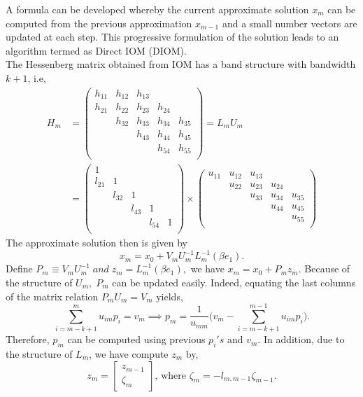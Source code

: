 \documentclass[10pt,a4paper]{article}
\begin{document}
A formula can be developed whereby the current approximate solution $x_m$ can be computed from the previous approximation $x_{m-1}$ and a small number vectors are updated at each step. This progressive formulation of the solution leads to an algorithm termed as Direct IOM (DIOM).\\
The Hessenberg matrix obtained from IOM has a band structure with bandwidth $k+1$, i.e,
\begin{align*}
H_m &= \left( \begin{array}{ccccc}
h_{11} & h_{12} & h_{13} &  &  \\
h_{21} & h_{22} & h_{23} & h_{24} &  \\
 & h_{32} & h_{33} & h_{34} & h_{35} \\
 &  & h_{43} & h_{44} & h_{45} \\
 &  &  & h_{54} & h_{55} \\
\end{array} \right) = L_mU_m \\
&= \left( \begin{array}{ccccc}
1 &  &  &  &  \\
l_{21} & 1 &  &  &  \\
 & l_{32} & 1 &  &  \\
 &  & l_{43} & 1 &  \\
 &  &  & l_{54} & 1 \\
\end{array} \right)\times 
\left( \begin{array}{ccccc}
u_{11} & u_{12} & u_{13} &  &  \\
 & u_{22} & u_{23} & u_{24} &  \\
 &  & u_{33} & u_{34} & u_{35} \\
 &  &  & u_{44} & u_{45} \\
 &  &  &  & u_{55} \\
\end{array} \right) 
\end{align*}
The approximate solution then is given by 
$$x_m=x_0+V_mU^{-1}_mL^{-1}_m(\beta e_1).$$
Define $P_m\equiv V_mU^{-1}_m\;and\;z_m=L^{-1}_m(\beta e_1),$ we have $x_m=x_0+P_mz_m.$ Because of the structure of $U_m,\;P_m$ can be updated easily. Indeed, equating the last columns of the matrix relation $P_mU_m=V_m$ yields,
$$\sum^m_{i=m-k+1} u_{im}p_i=v_m\implies p_m = \frac{1}{u_{mm}}\Bigg( v_m-\sum^{m-1}_{i=m-k+1}u_{im}p_i \Bigg).$$
Therefore, $p_m$ can be computed using previous $p_i's$ and $v_m$. In addition, due to the structure of $L_m$, we have compute $z_m$ by,
$$z_m=\left[ \begin{array}{c} z_{m-1} \\ \zeta_m \end{array} \right]\text{, where }\zeta_m=-l_{m,m-1}\zeta_{m-1}.$$
\end{document}
